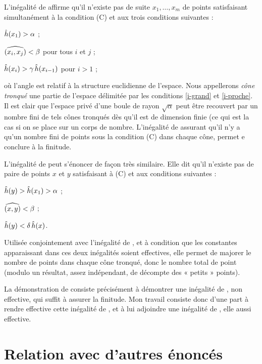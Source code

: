 L'inégalité de  affirme qu'il n'existe pas de suite $x_1, \dots,
x_m$ de points satisfaisant simultanément à la condition (C) et aux trois
conditions suivantes :
\begin{enumthm}
  \item $\mathop{\smash{\hat h}}(x_1) > \alpha$ ; \label{i-grand}
  \item $\widehat{(x_i,x_j)} < \beta$ pour tous $i$ et $j$ ; \label{i-proche}
  \item $\mathop{\smash{\hat h}}(x_i) > \gamma \mathop{\smash{\hat h}}(x_{i-1})$ pour $i > 1$ ;
\end{enumthm}
où l'angle est relatif à la structure euclidienne de l'espace. Nous
appellerons \emph{cône tronqué} une partie de l'espace délimitée par les
conditions \ref{i-grand} et \ref{i-proche}. Il est clair que l'espace privé
d'une boule de rayon $\sqrt{\alpha}$ peut être recouvert par un nombre fini de
tels cônes tronqués dès qu'il est de dimension finie (ce qui est la cas si on
se place sur un corps de nombre. L'inégalité de  assurant qu'il n'y
a qu'un nombre fini de points sous la condition (C) dans chaque cône, permet e
conclure à la finitude.

L'inégalité de  peut s'énoncer de façon très similaire. Elle dit
qu'il n'existe pas de paire de points $x$ et $y$ satisfaisant à (C) et aux
conditions suivantes :
\begin{enumthm}
  \item $\mathop{\smash{\hat h}}(y) > \mathop{\smash{\hat h}}(x_1) > \alpha$ ;
  \item $\widehat{(x,y)} < \beta$ ;
  \item $\mathop{\smash{\hat h}}(y) < \delta \mathop{\smash{\hat h}}(x)$.
\end{enumthm}
Utilisée conjointement avec l'inégalité de , et à condition que les
constantes apparaissant dans ces deux inégalités soient effectives, elle
permet de majorer le nombre de points dans chaque cône tronqué, donc le nombre
total de point (modulo un résultat, assez indépendant, de décompte des «
petits » points).

La démonstration de  consiste précisément à démontrer une
inégalité de , non effective, qui suffit à assurer la finitude. Mon
travail consiste donc d'une part à rendre effective cette inégalité de
, et à lui adjoindre une inégalité de , elle aussi
effective.

\ifdefined\publicversion \clearpage \fi
\section{Relation avec d'autres énoncés}

